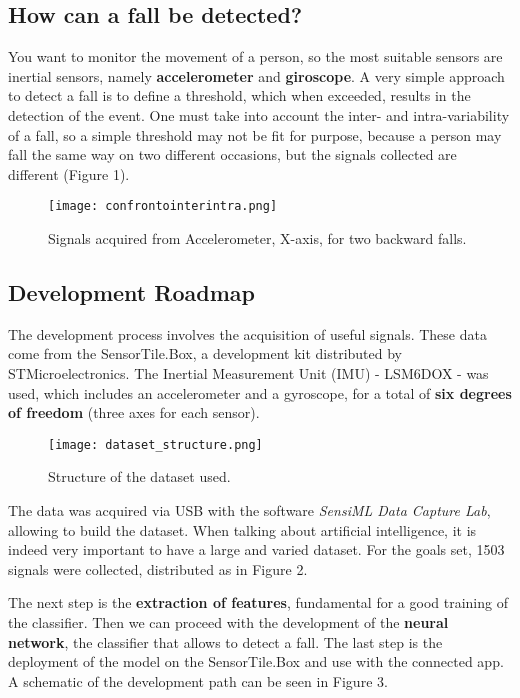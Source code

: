 \documentclass[12pt]{article}
\begin{document}
\subsection*{How can a fall be detected?}
You want to monitor the movement of a person, so the most suitable sensors are inertial sensors, namely \textbf{accelerometer} and \textbf{giroscope}. A very simple approach to detect a fall is to define a threshold, which when exceeded, results in the detection of the event. One must take into account the inter- and intra-variability of a fall, so a simple threshold may not be fit for purpose, because a person may fall the same way on two different occasions, but the signals collected are different (Figure 1).

\begin{figure}[!h]
    \centering
    \texttt{[image: confrontointerintra.png]}
    \caption{Signals acquired from Accelerometer, X-axis, for two backward falls.}
    \label{fig:label}
\end{figure}

\subsection*{Development Roadmap}
The development process involves the acquisition of useful signals. These data come from the SensorTile.Box, a development kit distributed by STMicroelectronics. The Inertial Measurement Unit (IMU) - LSM6DOX - was used, which includes an accelerometer and a gyroscope, for a total of \textbf{six degrees of freedom} (three axes for each sensor).

\begin{wrapfigure}{r}{0.60\textwidth}
\texttt{[image: dataset\_structure.png]} 
\caption{Structure of the dataset used.}
\label{fig:wrapfig}
\end{wrapfigure}

The data was acquired via USB with the software \emph{SensiML Data Capture Lab}, allowing to build the dataset.
When talking about artificial intelligence, it is indeed very important to have a large and varied dataset. For the goals set, 1503 signals were collected, distributed as in Figure 2.

The next step is the \textbf{extraction of features}, fundamental for a good training of the classifier.
Then we can proceed with the development of the \textbf{neural network}, the classifier that allows to detect a fall.
The last step is the deployment of the model on the SensorTile.Box and use with the connected app. A schematic of the development path can be seen in Figure 3.
\end{document}
